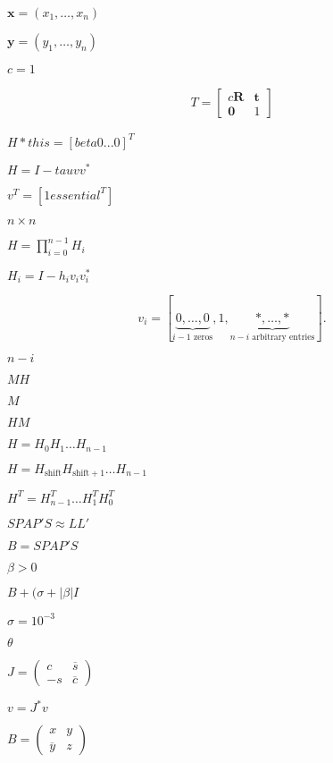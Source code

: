 \documentclass{article}
\begin{document}
$ \mathbf{x} = \left( x_1, \hdots, x_n \right) $
\pagebreak

$ \mathbf{y} = \left( y_1, \hdots, y_n \right) $
\pagebreak

$ c=1 $
\pagebreak

\begin{align*} T = \begin{bmatrix} c\mathbf{R} & \mathbf{t} \\ \mathbf{0} & 1 \end{bmatrix} \end{align*}
\pagebreak

$ H *this = [ beta 0 ... 0]^T $
\pagebreak

$ H = I - tau v v^*$
\pagebreak

$ v^T = [1 essential^T] $
\pagebreak

$ n \times n $
\pagebreak

$ H = \prod_{i=0}^{n-1} H_i $
\pagebreak

$ H_i = I - h_i v_i v_i^* $
\pagebreak

\[ v_i = [\underbrace{0, \ldots, 0}_{i-1\mbox{ zeros}}, 1, \underbrace{*, \ldots,*}_{n-i\mbox{ arbitrary entries}} ]. \]
\pagebreak

$ n-i $
\pagebreak

$ MH $
\pagebreak

$ M $
\pagebreak

$ HM $
\pagebreak

$ H = H_0 H_1 \ldots H_{n-1} $
\pagebreak

$ H = H_{\mathrm{shift}} H_{\mathrm{shift}+1} \ldots H_{n-1} $
\pagebreak

$ H^T = H_{n-1}^T \ldots H_1^T H_0^T $
\pagebreak

$ S P A P' S \approx L L' $
\pagebreak

$ B = S P A P' S $
\pagebreak

$ \beta > 0 $
\pagebreak

$ B + (\sigma+|\beta| I $
\pagebreak

$ \sigma = 10^{-3} $
\pagebreak

$ \theta $
\pagebreak

$ J = \left ( \begin{array}{cc} c & \overline s \\ -s & \overline c \end{array} \right ) $
\pagebreak

$ v = J^* v $
\pagebreak

$ B = \left ( \begin{array}{cc} x & y \\ \overline y & z \end{array} \right )$
\pagebreak
\end{document}
